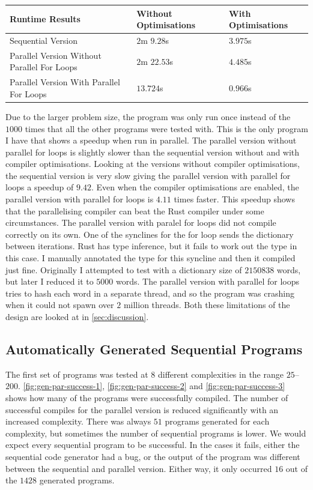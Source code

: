 \begin{tabularx}{\textwidth}{ | >{\centering\arraybackslash}X | >{\centering\arraybackslash}X | >{\centering\arraybackslash}X |}
	\hline
    Runtime Results & Without Optimisations & With Optimisations \\
    \hline
    Sequential Version & $2$m $9.28$s & $3.975$s \\
    \hline
    Parallel Version \hspace{5em} Without Parallel For Loops & $2$m $22.53$s & $4.485$s \\
    \hline
    Parallel Version \hspace{5em} With Parallel For Loops & $13.724$s & $0.966$s \\
    \hline
\end{tabularx}

Due to the larger problem size, the program was only run once instead of the $1000$ times that all the other programs were tested with. This is the only program I have that shows a speedup when run in parallel. The parallel version without parallel for loops is slightly slower than the sequential version without and with compiler optimisations. Looking at the versions without compiler optimisations, the sequential version is very slow giving the parallel version with parallel for loops a speedup of $9.42$. Even when the compiler optimisations are enabled, the parallel version with parallel for loops is $4.11$ times faster. This speedup shows that the parallelising compiler can beat the Rust compiler under some circumstances.
The parallel version with paralel for loops did not compile correctly on its own. One of the synclines for the for loop sends the dictionary between iterations. Rust has type inference, but it fails to work out the type in this case. I manually annotated the type for this syncline and then it compiled just fine. Originally I attempted to test with a dictionary size of $2150838$ words, but later I reduced it to $5000$ words. The parallel version with parallel for loops tries to hash each word in a separate thread, and so the program was crashing when it could not spawn over $2$ million threads. Both these limitations of the design are looked at in \autoref{sec:discussion}.

\subsection{Automatically Generated Sequential Programs}
The first set of programs was tested at $8$ different complexities in the range $25$--$200$.
\autoref{fig:gen-par-success-1}, \autoref{fig:gen-par-success-2} and \autoref{fig:gen-par-success-3} shows how many of the programs were successfully compiled. The number of successful compiles for the parallel version is reduced significantly with an increased complexity. There was always $51$ programs generated for each complexity, but sometimes the number of sequential programs is lower. We would expect every sequential program to be successful. In the cases it fails, either the sequential code generator had a bug, or the output of the program was different between the sequential and parallel version. Either way, it only occurred $16$ out of the $1428$ generated programs.

